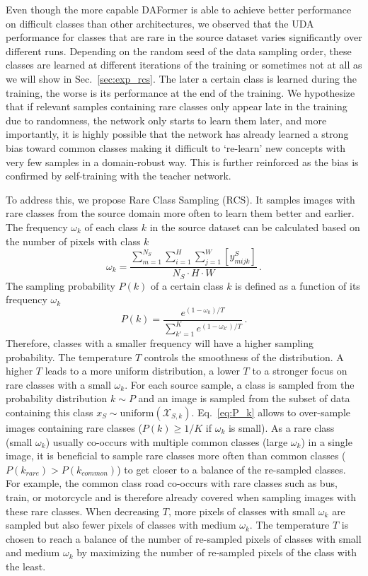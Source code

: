 \documentclass[journal,compsoc]{IEEEtran}
\begin{document}
Even though the more capable DAFormer is able to achieve better performance on difficult classes than other architectures,
we observed that the UDA performance for classes that are rare in the source dataset varies significantly over different runs.
Depending on the random seed of the data sampling order, these classes are learned at different iterations of the training or sometimes not at all as we will show in Sec.~\ref{sec:exp_rcs}.
The later a certain class is learned during the training, the worse is its performance at the end of the training. 
We hypothesize that if relevant samples containing rare classes only appear late in the training due to randomness, the network only starts to learn them later, and more importantly, it is highly possible that the network has already learned a strong bias toward common classes making it difficult to `re-learn' new concepts with very few samples in a domain-robust way. This is further reinforced as the bias is confirmed by self-training with the teacher network.

To address this, we propose Rare Class Sampling (RCS). It samples images with rare classes from the source domain more often to learn them 
better and earlier.
The frequency $\omega_k$ of each class $k$ in the source dataset can be calculated based on the number of pixels with class $k$
\begin{equation}
    \omega_k = \frac{\sum_{m=1}^{N_S} \sum_{i=1}^{H} \sum_{j=1}^{W} [y^S_{mijk}]}{N_S \cdot H \cdot W}\,.
\end{equation}
The sampling probability $P(k)$ of a certain class $k$ is defined as a function of its frequency $\omega_k$
\begin{equation}
    P(k) = \frac{e^{(1-\omega_k) / T}}{\sum_{k'=1}^K e^{(1-\omega_{k'}) / T}}\,.
    \label{eq:P_k}
\end{equation}
Therefore, classes with a smaller frequency will have a higher sampling probability. The temperature $T$ controls the smoothness of the distribution. A higher $T$ leads to a more uniform distribution, a lower $T$ to a stronger focus on rare classes with a small $\omega_k$.
For each source sample, a class is sampled from the probability distribution $k \sim P$ and an image is sampled from the subset of data containing this class $x_S \sim \text{uniform}(\mathcal{X}_{S,k})$.
Eq.~\ref{eq:P_k} allows to over-sample images containing rare classes ($P(k) \geq 1 / K$ if $\omega_k$ is small). 
As a rare class (small $\omega_k$) usually co-occurs with multiple common classes (large $\omega_k$) in a single image, it is beneficial to sample rare classes more often than common classes ($P(k_\textit{rare}) > P(k_\textit{common})$) to get closer to a balance of the re-sampled classes.
For example, the common class road co-occurs with rare classes such as bus, train, or motorcycle and is therefore already covered when sampling images with these rare classes.
When decreasing $T$, more pixels of classes with small $\omega_k$ are sampled but also fewer pixels of classes with medium $\omega_k$. The temperature $T$ is chosen to reach a balance of the number of re-sampled pixels of classes with small and medium $\omega_k$ by maximizing the number of re-sampled pixels of the class with the least.
\end{document}
